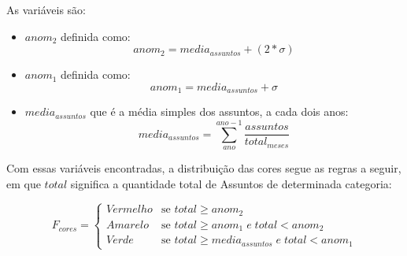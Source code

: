 As variáveis são:
\begin{itemize}
	\item $anom_2$ definida como: $$anom_2 = media_{assuntos} + (2*\sigma)$$
	
	\item $anom_1$ definida como: $$anom_1 = media_{assuntos} + \sigma$$
	
	\item $media_{assuntos}$ que é a média simples dos assuntos, a cada dois anos:
	$$media_{assuntos} = \sum\limits_{ano}^{ano-1}\frac{assuntos}{total_{meses}}$$
\end{itemize}

Com essas variáveis encontradas, a distribuição das cores segue as regras a seguir, em que $total$ significa a quantidade total de Assuntos de determinada categoria:

\begin{equation}
	F_{cores} =
	\begin{cases}
		Vermelho & \text{se $total \geq anom_2$}\\
		Amarelo & \text{se $total \geq anom_1 \;e\; total < anom_2$}\\
		Verde & \text{se $total \geq media_{assuntos} \;e\; total < anom_1$}
	\end{cases}       
\end{equation}



